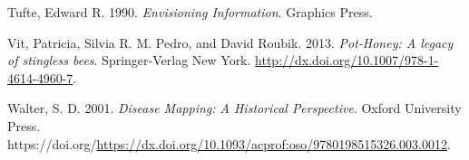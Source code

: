 \begin{CSLReferences}{1}{0}
\leavevmode{}%
Tufte, Edward R. 1990. \emph{Envisioning Information}. Graphics Press.

\leavevmode{}%
Vit, Patricia, Silvia R. M. Pedro, and David Roubik. 2013. \emph{{Pot-Honey: A legacy of stingless bees}}. Springer-Verlag New York. \url{http://dx.doi.org/10.1007/978-1-4614-4960-7}.

\leavevmode{}%
Walter, S. D. 2001. \emph{{Disease Mapping: A Historical Perspective}}. Oxford University Press. https://doi.org/\url{https://dx.doi.org/10.1093/acprof:oso/9780198515326.003.0012}.

\end{CSLReferences}



\address{%
Stephanie Kobakian\\
\\%
Sydney, Australia\\
%
%
\textit{ORCiD: \href{https://orcid.org/0000-0002-4616-0048}{0000-0002-4616-0048}}\\%
\href{mailto:stephanie.kobakian@gmail.com}{\nolinkurl{stephanie.kobakian@gmail.com}}%
}

\address{%
Dianne Cook\\
Monash University\\%
Department of Econometrics and Business Statistics\\
%
%
\textit{ORCiD: \href{https://orcid.org/0000-0002-3813-7155}{0000-0002-3813-7155}}\\%
\href{mailto:dicook@monash.edu}{\nolinkurl{dicook@monash.edu}}%
}

\address{%
Earl Duncan\\
Queensland University of Technology\\%
School of Mathematical Sciences\\
%
%
\textit{ORCiD: \href{https://orcid.org/0000-0002-5146-7810}{0000-0002-5146-7810}}\\%
\href{mailto:earl.duncan@qut.edu.au}{\nolinkurl{earl.duncan@qut.edu.au}}%
}
